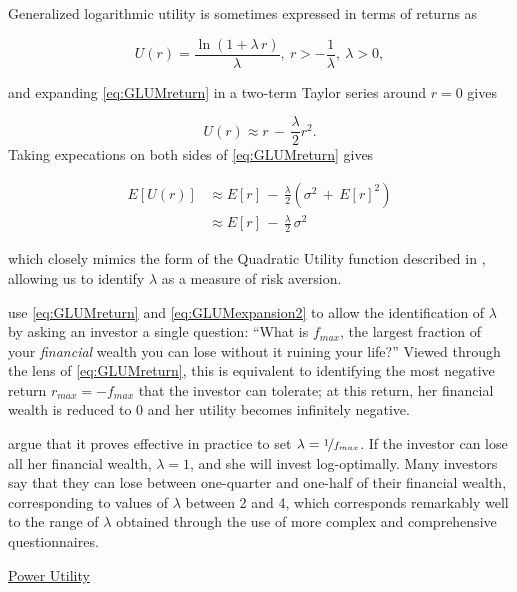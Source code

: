 \documentclass[graybox,envcountchap,sectrefs]{svmono}\usepackage[]{graphicx}\usepackage[]{xcolor}
\begin{document}
\begin{appendices}
Generalized logarithmic utility is sometimes expressed in terms of
returns as

\begin{equation}
\mathit{U}(r)=\frac{\ln(1+\lambda\,r)}{\lambda},\ r>-\frac{1}{\lambda},\ \lambda>0,\label{eq:GLUMreturn}
\end{equation}

and expanding \eqref{eq:GLUMreturn} in a two-term Taylor series around
$r=0$ gives

\begin{equation}
U(r)\approx r\,-\,\frac{\lambda}{2}r^{2}.\label{eq:GLUMexpansion}
\end{equation}
Taking expecations on both sides of \eqref{eq:GLUMreturn} gives

\begin{align}
E\left[U(r)\right] & \approx E\left[r\right]\,-\,\frac{\lambda}{2}\left(\sigma^{2}\,+\,E\left[r\right]^{2}\right)\nonumber \\
 & \approx E\left[r\right]\,-\,\frac{\lambda}{2}\,\sigma^{2}\label{eq:GLUMexpansion2}
\end{align}

which closely mimics the form of the Quadratic Utility function described
in \MVOSection, allowing us to identify $\lambda$ as a measure of
risk aversion. 

\citet{WilcoxZieffSatchell2025} use \eqref{eq:GLUMreturn} and \eqref{eq:GLUMexpansion2}
to allow the identification of $\lambda$ by asking an investor a
single question: ``What is $f_{max}$, the largest fraction of your
\emph{financial} wealth you can lose without it ruining your life?''
Viewed through the lens of \eqref{eq:GLUMreturn}, this is equivalent
to identifying the most negative return $r_{max}=-f_{max}$ that the
investor can tolerate; at this return, her financial wealth is reduced
to 0 and her utility becomes infinitely negative. 

\citet{WilcoxZieffSatchell2025} argue that it proves effective in
practice to set $\lambda=\nicefrac{1}{f_{max}}$. If the investor
can lose all her financial wealth, $\lambda=1$, and she will invest
log-optimally. Many investors say that they can lose between one-quarter
and one-half of their financial wealth, corresponding to values of
$\lambda$ between 2 and 4, which corresponds remarkably well to the
range of $\lambda$ obtained through the use of more complex and comprehensive
questionnaires.

\medskip{}

\uline{Power Utility}


\end{appendices}
\end{document}
